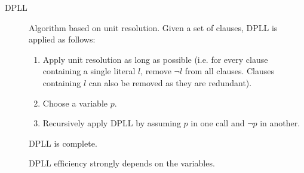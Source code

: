 \begin{description}
    \item[DPLL]  
        Algorithm based on unit resolution.
        Given a set of clauses, DPLL is applied as follows:
        \begin{enumerate}
            \item Apply unit resolution as long as possible 
                (i.e. for every clause containing a single literal $l$, remove $\lnot l$ from all clauses. 
                Clauses containing $l$ can also be removed as they are redundant).
            \item Choose a variable $p$.
            \item Recursively apply DPLL by assuming $p$ in one call and $\lnot p$ in another.
        \end{enumerate}

        \begin{theorem}
            DPLL is complete.
        \end{theorem}

        \begin{remark}
            DPLL efficiency strongly depends on the variables.
        \end{remark}
\end{description}

